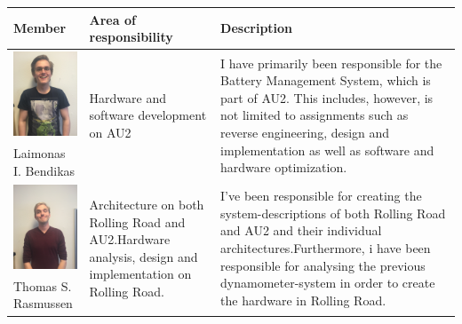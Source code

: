 \newpage
\begin{tabular}[c]{|p{3cm}| p{5cm} | p{6cm}|}
	\hline
	\textbf{Member} & \textbf{Area of responsibility} & \textbf{Description}\\\hline
	
	\phantom{Test}
	\includegraphics[width=3cm]{Introduction/TeamPictures/Laimonas} & \multirow{2}{5cm}{Hardware and software development on AU2} & \multirow{2}{6cm}{I have primarily been responsible for the Battery Management System, which is part of AU2. This includes, however, is not limited to assignments such as reverse engineering, design and implementation as well as software and hardware optimization.} \\
	Laimonas I. \newline Bendikas & & \\ \hline
		
	\phantom{Test}
	\includegraphics[width=3cm]{Introduction/TeamPictures/ThomasR} & \multirow{2}{5cm}{Architecture on both Rolling Road and AU2.\newline \newline Hardware analysis, design and implementation on Rolling Road.} & \multirow{2}{6cm}{I've been responsible for creating the system-descriptions of both Rolling Road and AU2 and their individual architectures.\newline \newline Furthermore, i have been responsible for analysing the previous dynamometer-system in order to create the hardware in Rolling Road.} \\
	Thomas S. \newline Rasmussen & & \\ \hline
		

\end{tabular}
